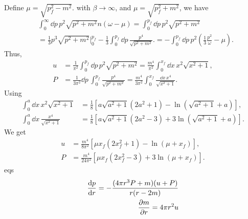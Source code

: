Define $\mu = \sqrt{p_f^2 - m^2}$.
with $\beta \rightarrow \infty$, and $\mu = \sqrt{p_f^2 + m^2}$, we have
%
\begin{align}
    &\int_0^\infty \dd p \, p^2  \sqrt{p^2 + m^2} n(\omega - \mu)
    =
    \int_0^{p_f} \dd p \, p^2 \sqrt{p^2 + m^2}\\
    & = \frac{1}{3} p^3 \sqrt{p^2 + m^2 }\bigg|_0^{p_f} 
    - \frac{1}{3}\int_0^{p_f} \dd p \, \frac{p^4}{\sqrt{p^2 + m^2}}.
    =
    -
    \int_0^{p_f}
    \dd p \, p^2
    \left(
        \frac{1}{3}
        \frac{p^2}{\omega}
        - \mu
    \right).
\end{align}
%
Thus,
%
\begin{align}
    u &= \frac{1}{\pi^2} \int_0^{p_f} \dd p \,
    p^2 \sqrt{p^2 + m^2}
    = \frac{m^4}{\pi^2} \int_0^{x_f} \dd x \, x^2 \sqrt{x^2 + 1}, \\
    P & = \frac{1}{3 \pi^2} \dd p \, \int_0^{p_f}\frac{p^4}{\sqrt{p^2 + m^2}} 
    = \frac{m^4}{3 \pi^2} \int_0^{x_f} \frac{\dd x \, x^4}{\sqrt{x^2 + 1}}.
\end{align}
%
Using 
%
\begin{align}
    \int_0^a \dd x \, x^2 \sqrt{x^2 + 1} 
    & = \frac{1}{8} 
    \left[a \sqrt{a^2 + 1}(2 a^2 + 1) - \ln\left(\sqrt{a^2 + 1} + a\right)\right], \\
    \int_0^a \dd x \, \frac{x^4}{\sqrt{x^2 + 1} }
    & = \frac{1}{8} 
    \left[a \sqrt{a^2 + 1}(2 a^2 - 3) + 3\ln\left(\sqrt{a^2 + 1} + a\right)\right].
\end{align}
%
We get 
%
\begin{align}
    u &= \frac{m^4}{8 \pi^2} 
    \left[\mu x_f (2x_f^2 + 1) - \ln\left(\mu + x_f\right)\right], \\
    P &= \frac{m^4}{24 \pi^2} 
    \left[\mu x_f (2x_f^2 -3) + 3\ln\left(\mu + x_f\right)\right].
\end{align}
%
eqs
%
\begin{align}
    \diff{p}{r} = - \frac{(4 \pi r^3 P + m)(u + P)}{r(r - 2 m)} \\
    \diffp{m}{r} = 4 \pi r^2 u
\end{align}